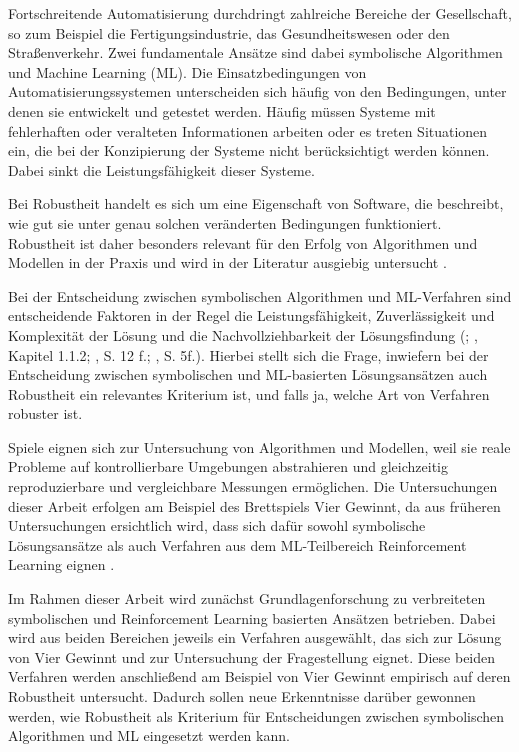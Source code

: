 Fortschreitende Automatisierung durchdringt zahlreiche Bereiche der Gesellschaft, so zum Beispiel die Fertigungsindustrie, das Gesundheitswesen oder den Straßenverkehr. Zwei fundamentale Ansätze sind dabei symbolische Algorithmen und Machine Learning (ML). Die Einsatzbedingungen von Automatisierungssystemen unterscheiden sich häufig von den Bedingungen, unter denen sie entwickelt und getestet werden. Häufig müssen Systeme mit fehlerhaften oder veralteten Informationen arbeiten oder es treten Situationen ein, die bei der Konzipierung der Systeme nicht berücksichtigt werden können. Dabei sinkt die Leistungsfähigkeit dieser Systeme.

Bei Robustheit handelt es sich um eine Eigenschaft von Software, die beschreibt, wie gut sie unter genau solchen veränderten Bedingungen funktioniert. Robustheit ist daher besonders relevant für den Erfolg von Algorithmen und Modellen in der Praxis und wird in der Literatur ausgiebig untersucht \cite{Micskei.2012}\cite{Moos.2022}\cite{Ni.2021}.

Bei der Entscheidung zwischen symbolischen Algorithmen und ML-Verfahren sind entscheidende Faktoren in der Regel die Leistungsfähigkeit, Zuverlässigkeit und Komplexität der Lösung und die Nachvollziehbarkeit der Lösungsfindung (\cite{Dabas.2022}; \cite{Ferguson.January2019}, Kapitel 1.1.2; \cite{Humm.2020}, S. 12 f.; \cite{Früh.2022}, S. 5f.). Hierbei stellt sich die Frage, inwiefern bei der Entscheidung zwischen symbolischen und ML-basierten Lösungsansätzen auch Robustheit ein relevantes Kriterium ist, und falls ja, welche Art von Verfahren robuster ist.

Spiele eignen sich zur Untersuchung von Algorithmen und Modellen, weil sie reale Probleme auf kontrollierbare Umgebungen abstrahieren und gleichzeitig reproduzierbare und vergleichbare Messungen ermöglichen. Die Untersuchungen dieser Arbeit erfolgen am Beispiel des Brettspiels Vier Gewinnt, da aus früheren Untersuchungen ersichtlich wird, dass sich dafür sowohl symbolische Lösungsansätze als auch Verfahren aus dem ML-Teilbereich Reinforcement Learning eignen \cite{Qiu.2022}\cite{Sheoran.2022}\cite{Alderton.2019}\cite{Taylor.2024}\cite{Dabas.2022}\cite{Wäldchen.2022}.

Im Rahmen dieser Arbeit wird zunächst Grundlagenforschung zu verbreiteten symbolischen und Reinforcement Learning basierten Ansätzen betrieben. Dabei wird aus beiden Bereichen jeweils ein Verfahren ausgewählt, das sich zur Lösung von Vier Gewinnt und zur Untersuchung der Fragestellung eignet. Diese beiden Verfahren werden anschließend am Beispiel von Vier Gewinnt empirisch auf deren Robustheit untersucht. Dadurch sollen neue Erkenntnisse darüber gewonnen werden, wie Robustheit als Kriterium für Entscheidungen zwischen symbolischen Algorithmen und ML eingesetzt werden kann.
